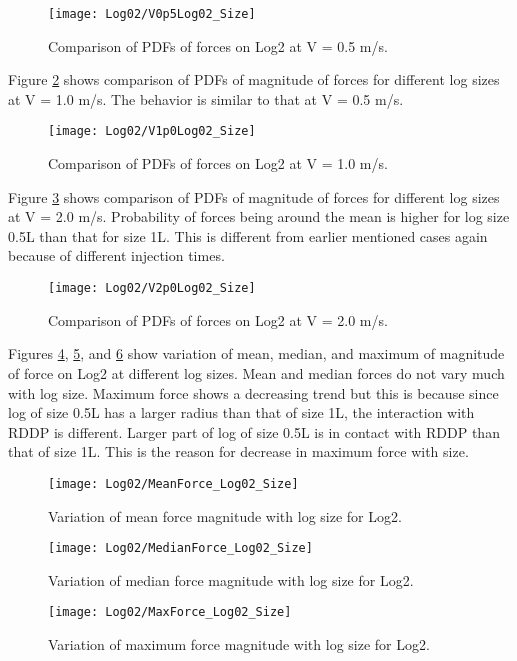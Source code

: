 \begin{figure}
\centering
\texttt{[image: Log02/V0p5Log02\_Size]}
\caption{\label{fig:V0p5Log02_Size}Comparison of PDFs of forces on Log2 at V = 0.5 m/s.}
\end{figure}

\noindent Figure \ref{fig:V1p0Log02_Size} shows comparison of PDFs of magnitude of forces for different log sizes at V = 1.0 m/s. The behavior is similar to that at V = 0.5 m/s.

\begin{figure}
\centering
\texttt{[image: Log02/V1p0Log02\_Size]}
\caption{\label{fig:V1p0Log02_Size}Comparison of PDFs of forces on Log2 at V = 1.0 m/s.}
\end{figure}

\noindent Figure \ref{fig:V2p0Log02_Size} shows comparison of PDFs of magnitude of forces for different log sizes at V = 2.0 m/s. Probability of forces being around the mean is higher for log size 0.5L than that for size 1L. This is different from earlier mentioned cases again because of different injection times. 

\begin{figure}
\centering
\texttt{[image: Log02/V2p0Log02\_Size]}
\caption{\label{fig:V2p0Log02_Size}Comparison of PDFs of forces on Log2 at V = 2.0 m/s.}
\end{figure}

\noindent Figures \ref{fig:MeanForce_Log02_Size}, \ref{fig:MedianForce_Log02_Size}, and \ref{fig:MaxForce_Log02_Size} show variation of mean, median, and maximum of magnitude of force on Log2 at different log sizes. Mean and median forces do not vary much with log size. Maximum force shows a decreasing trend but this is because since log of size 0.5L has a larger radius than that of size 1L, the interaction with RDDP is different. Larger part of log of size 0.5L  is in contact with RDDP than that of size 1L. This is the reason for decrease in maximum force with size. 

\begin{figure}
\centering
\texttt{[image: Log02/MeanForce\_Log02\_Size]}
\caption{\label{fig:MeanForce_Log02_Size}Variation of mean force magnitude with log size for Log2.}
\end{figure}
\begin{figure}
\centering
\texttt{[image: Log02/MedianForce\_Log02\_Size]}
\caption{\label{fig:MedianForce_Log02_Size}Variation of median force magnitude with log size for Log2.}
\end{figure}
\begin{figure}
\centering
\texttt{[image: Log02/MaxForce\_Log02\_Size]}
\caption{\label{fig:MaxForce_Log02_Size}Variation of maximum force magnitude with log size for Log2.}
\end{figure}

